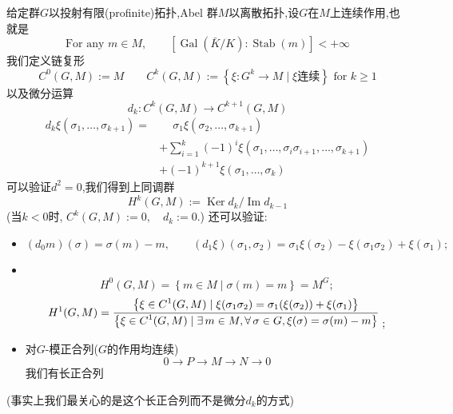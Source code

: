 \documentclass[12pt,A4paper,oneside,reqno]{amsart}
\numberwithin{equation}{section}
\theoremstyle{definition}
\theoremstyle{plain}
\theoremstyle{plain}
\numberwithin{equation}{section}
\theoremstyle{remark}
\DeclareMathOperator{\Ker}{\operatorname{Ker}}
\DeclareMathOperator{\Img}{\operatorname{Im}}
\newcommand{\Gal}{\operatorname{Gal}}
\newcommand{\Stab}{\operatorname{Stab}}
\begin{document}
给定群$G$以投射有限(profinite)拓扑,Abel 群$M$以离散拓扑,设$G$在$M$上连续作用,也就是
$$ \text{For any } m \in M,\qquad [\Gal(\bar{K}/K):\Stab(m)] < +\infty$$
我们定义链复形
$$C^0(G,M):=M\qquad C^k(G,M):= \left\{\xi: G^k \rightarrow M \mid \xi \text{连续}\right\} \text{ for } k\geqslant 1$$
以及微分运算
$$d_k:C^k(G,M) \longrightarrow C^{k+1}(G,M)$$
\begin{equation*}
\begin{aligned}
d_k\xi (\sigma_1, \ldots,\sigma_{k+1})=&\phantom{+}\sigma_1\xi (\sigma_2, \ldots , \sigma_{k+1})\\
&+\sum_{i=1}^{k}(-1)^i\xi (\sigma_1, \ldots,\sigma_i\sigma_{i+1}, \ldots,\sigma_{k+1})\\
&+(-1)^{k+1}\xi (\sigma_1,\ldots,\sigma_k)
\end{aligned}
\end{equation*}
可以验证$d^2=0$,我们得到上同调群$$H^k(G,M):=\Ker d_k /\Img d_{k-1}$$
(当$k<0$时, $C^k(G,M):=0, \quad d_k:=0.$)
还可以验证:
\begin{itemize}
	\item $(d_0 m) (\sigma)=\sigma(m) -m, 	\qquad (d_1 \xi) (\sigma_1,\sigma_2)=\sigma_1 \xi(\sigma_2)-\xi(\sigma_1\sigma_2)+\xi(\sigma_1);$
	\item \phantom{1}\\[-1cm] $$H^0(G,M)=\left\{m \in M \mid \sigma(m)=m\right\}=M^G;$$
	$$H^1(G,M)=\frac{\displaystyle\left\{\xi \in C^1(G,M) \mid \xi (\sigma_1\sigma_2)=\sigma_1(\xi(\sigma_2))+\xi(\sigma_1)\right\}}{\displaystyle\left\{\xi \in C^1(G,M) \mid\exists\, m \in M,\forall\,\sigma \in G, \xi(\sigma)=\sigma(m)-m\right\}}\;\raisebox{-10pt}{;}$$
	\item 对$G$-模正合列($G$的作用均连续)
	$$0 \longrightarrow P \longrightarrow M \longrightarrow N \longrightarrow 0$$
	我们有长正合列
	\begin{center}
	\end{center}
\end{itemize}
(事实上我们最关心的是这个长正合列而不是微分$d_k$的方式)
\end{document}
